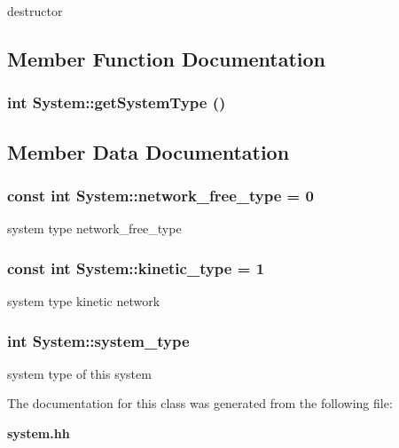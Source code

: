 destructor 



\subsection{Member Function Documentation}
\subsubsection[getSystemType]{\setlength{\rightskip}{0pt plus 5cm}int System::getSystemType ()}\label{classSystem_699b1f28b3799c1a6ada738d11ebe9b8}




\subsection{Member Data Documentation}
\subsubsection[network\_\-free\_\-type]{\setlength{\rightskip}{0pt plus 5cm}const int {\bf System::network\_\-free\_\-type} = 0\hspace{0.3cm}{\tt  [static]}}\label{classSystem_25cba1323d32896bbea696f768ae3ffa}


system type network\_\-free\_\-type 

\subsubsection[kinetic\_\-type]{\setlength{\rightskip}{0pt plus 5cm}const int {\bf System::kinetic\_\-type} = 1\hspace{0.3cm}{\tt  [static]}}\label{classSystem_11acc6ac27f92d4a3c96551712206ed2}


system type kinetic network 

\subsubsection[system\_\-type]{\setlength{\rightskip}{0pt plus 5cm}int {\bf System::system\_\-type}\hspace{0.3cm}{\tt  [protected]}}\label{classSystem_47960ee19a7317ccfe0a45425b616e87}


system type of this system 



The documentation for this class was generated from the following file:\begin{CompactItemize}
\item 
{\bf system.hh}\end{CompactItemize}
